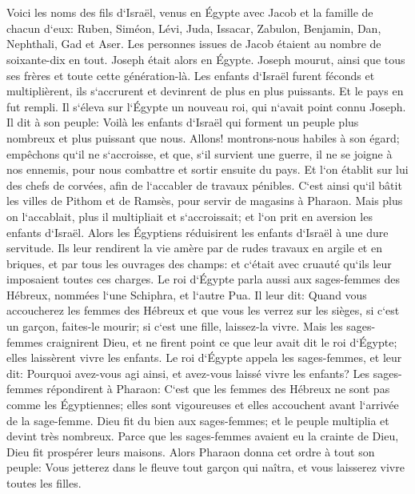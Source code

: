 

\chapter{}

\verse Voici les noms des fils d`Israël, venus en Égypte avec Jacob et la famille de chacun d`eux: 
\verse Ruben, Siméon, Lévi, Juda, 
\verse Issacar, Zabulon, Benjamin, 
\verse Dan, Nephthali, Gad et Aser. 
\verse Les personnes issues de Jacob étaient au nombre de soixante-dix en tout. Joseph était alors en Égypte. 
\verse Joseph mourut, ainsi que tous ses frères et toute cette génération-là. 
\verse Les enfants d`Israël furent féconds et multiplièrent, ils s`accrurent et devinrent de plus en plus puissants. Et le pays en fut rempli. 
\verse Il s`éleva sur l`Égypte un nouveau roi, qui n`avait point connu Joseph. 
\verse Il dit à son peuple: Voilà les enfants d`Israël qui forment un peuple plus nombreux et plus puissant que nous. 
\verse Allons! montrons-nous habiles à son égard; empêchons qu`il ne s`accroisse, et que, s`il survient une guerre, il ne se joigne à nos ennemis, pour nous combattre et sortir ensuite du pays. 
\verse Et l`on établit sur lui des chefs de corvées, afin de l`accabler de travaux pénibles. C`est ainsi qu`il bâtit les villes de Pithom et de Ramsès, pour servir de magasins à Pharaon. 
\verse Mais plus on l`accablait, plus il multipliait et s`accroissait; et l`on prit en aversion les enfants d`Israël. 
\verse Alors les Égyptiens réduisirent les enfants d`Israël à une dure servitude. 
\verse Ils leur rendirent la vie amère par de rudes travaux en argile et en briques, et par tous les ouvrages des champs: et c`était avec cruauté qu`ils leur imposaient toutes ces charges. 
\verse Le roi d`Égypte parla aussi aux sages-femmes des Hébreux, nommées l`une Schiphra, et l`autre Pua. 
\verse Il leur dit: Quand vous accoucherez les femmes des Hébreux et que vous les verrez sur les sièges, si c`est un garçon, faites-le mourir; si c`est une fille, laissez-la vivre. 
\verse Mais les sages-femmes craignirent Dieu, et ne firent point ce que leur avait dit le roi d`Égypte; elles laissèrent vivre les enfants. 
\verse Le roi d`Égypte appela les sages-femmes, et leur dit: Pourquoi avez-vous agi ainsi, et avez-vous laissé vivre les enfants? 
\verse Les sages-femmes répondirent à Pharaon: C`est que les femmes des Hébreux ne sont pas comme les Égyptiennes; elles sont vigoureuses et elles accouchent avant l`arrivée de la sage-femme. 
\verse Dieu fit du bien aux sages-femmes; et le peuple multiplia et devint très nombreux. 
\verse Parce que les sages-femmes avaient eu la crainte de Dieu, Dieu fit prospérer leurs maisons. 
\verse Alors Pharaon donna cet ordre à tout son peuple: Vous jetterez dans le fleuve tout garçon qui naîtra, et vous laisserez vivre toutes les filles. 

